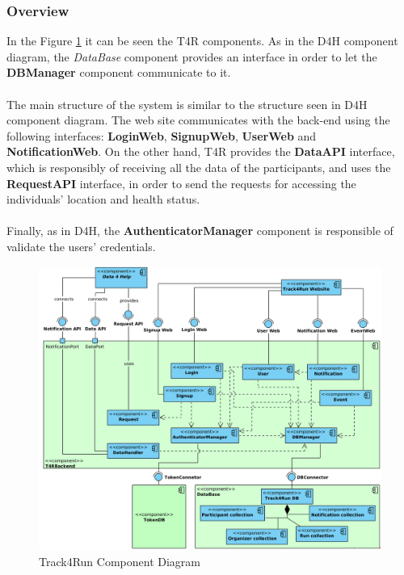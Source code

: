 \documentclass[a4paper, hidelinks, 12pt]{report}
\begin{document}
		\subsubsection{Overview}
			In the Figure \ref{fig:t4r_component_diagram} it can be seen the T4R components. As in the D4H component diagram, the \textit{DataBase} component provides an interface in order to let the \textbf{DBManager} component communicate to it.\\\\
			The main structure of the system is similar to the structure seen in D4H component diagram. The web site communicates with the back-end using the following interfaces: \textbf{LoginWeb}, \textbf{SignupWeb}, \textbf{UserWeb} and \textbf{NotificationWeb}. On the other hand, T4R provides the \textbf{DataAPI} interface, which is responsibly of receiving all the data of the participants, and uses the \textbf{RequestAPI} interface, in order to send the requests for accessing the individuals' location and health status.\\\\
			Finally, as in D4H, the \textbf{AuthenticatorManager} component is responsible of validate the users' credentials.
			\begin{figure}[H]
				\centering
				\includegraphics[width=1\textwidth]{diagrams/t4r_component_diagram.png}
				\caption[Track4Run Component Diagram]{Track4Run Component Diagram}
				\label{fig:t4r_component_diagram}
			\end{figure}	
			
\end{document}
